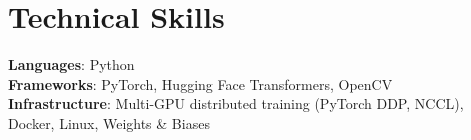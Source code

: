 \documentclass[letterpaper,11pt]{article}
\begin{document}
\vspace{5pt}

\section{Technical Skills}
 \begin{itemize}[leftmargin=0.15in, label={}]
    \small{\item{
     \textbf{Languages}{: Python} \\
     \textbf{Frameworks}{: PyTorch, Hugging Face Transformers, OpenCV} \\
     \textbf{Infrastructure}{: Multi-GPU distributed training (PyTorch DDP, NCCL), Docker, Linux, Weights \& Biases} \\
    }}
 \end{itemize}
 \vspace{-16pt}
\end{document}
